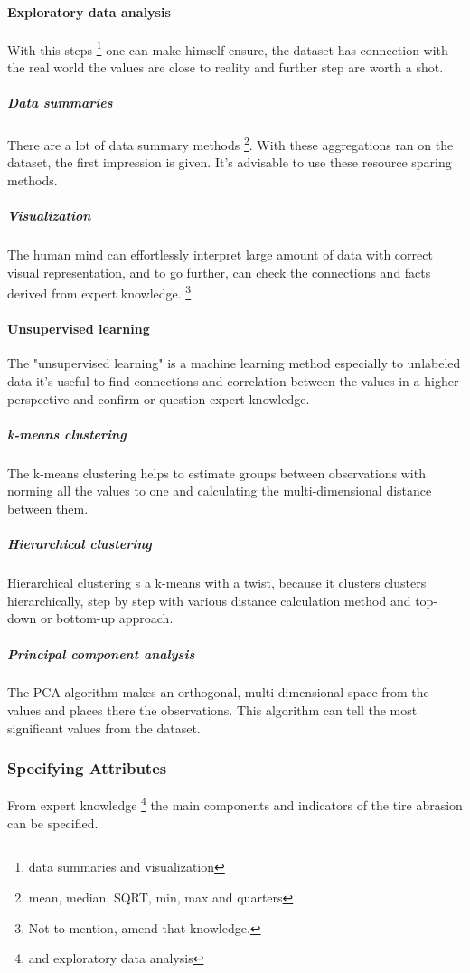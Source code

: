 		\paragraph{Exploratory data analysis}
			With this steps \footnote{data summaries and visualization} one can make himself ensure, the dataset has connection with the real world the values are close to reality and further step are worth a shot.
			\subparagraph{Data summaries}
			There are a lot of data summary methods \footnote{mean, median, SQRT, min, max and quarters}. With these aggregations ran on the dataset, the first impression is given. It's advisable to use these resource sparing methods.
			\subparagraph{Visualization}
			The human mind can effortlessly interpret large amount of data with correct visual representation, and to go further, can check the connections and facts derived from expert knowledge. \footnote{Not to mention, amend that knowledge.} 
		\paragraph{Unsupervised learning}
		The "unsupervised learning" \cite{UnsuplearnBook} is a machine learning method especially to unlabeled data it's useful to find connections and correlation between the values in a higher perspective and confirm or question expert knowledge.

		\subparagraph{k-means clustering}
		\cite{k-means}\cite{kmeans2} The k-means clustering helps to estimate groups between observations with norming all the values to one and calculating the multi-dimensional distance between them.
		\subparagraph{Hierarchical clustering}
		\cite{h-clust}\cite{h-clust2}\cite{Clustering} Hierarchical clustering s a k-means with a twist, because it clusters clusters hierarchically, step by step with various distance calculation method and top-down or bottom-up approach.
		\subparagraph{Principal component analysis}
		The PCA \cite{PCA} algorithm makes an orthogonal, multi dimensional space from the values and places there the observations. This algorithm can tell the most significant values from the dataset.
	\subsubsection{Specifying Attributes}
	From expert knowledge \footnote{and exploratory data analysis} the main components and indicators of the tire abrasion can be specified.

